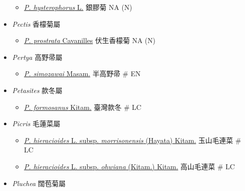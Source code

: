\begin{itemize}
  \begin{itemize}
        \item[] \href{http://www.theplantlist.org/tpl1.1/search?q=Parthenium+hysterophorus}{\textit{P. hysterophorus} L.}   銀膠菊   NA (N)
  \end{itemize}
 \item[] \textit{Pectis} 香檬菊屬
                                
  \begin{itemize}
        \item[] \href{http://www.theplantlist.org/tpl1.1/search?q=Pectis+prostrata}{\textit{P. prostrata} Cavanilles}   伏生香檬菊   NA (N)
  \end{itemize}
 \item[] \textit{Pertya} 高野帚屬
                                
  \begin{itemize}
        \item[] \href{http://www.theplantlist.org/tpl1.1/search?q=Pertya+simozawai}{\textit{P. simozawai} Masam.}   半高野帚  \# EN
  \end{itemize}
 \item[] \textit{Petasites} 款冬屬
                                
  \begin{itemize}
        \item[] \href{http://www.theplantlist.org/tpl1.1/search?q=Petasites+formosanus}{\textit{P. formosanus} Kitam.}   臺灣款冬  \# LC
  \end{itemize}
 \item[] \textit{Picris} 毛蓮菜屬
                                
  \begin{itemize}
        \item[] \href{http://www.theplantlist.org/tpl1.1/search?q=Picris+hieracioides+subsp.+morrisonensis}{\textit{P. hieracioides} L. subsp. \textit{morrisonensis} (Hayata) Kitam.}   玉山毛連菜  \# LC
        \item[] \href{http://www.theplantlist.org/tpl1.1/search?q=Picris+hieracioides+subsp.+ohwiana}{\textit{P. hieracioides} L. subsp. \textit{ohwiana} (Kitam.) Kitam.}   高山毛連菜  \# LC
  \end{itemize}
 \item[] \textit{Pluchea} 闊苞菊屬
                                

\end{itemize}
